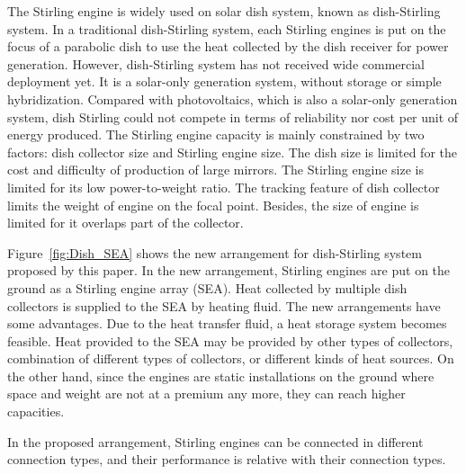 \documentclass[review,3p,10t]{elsarticle}
\begin{document}
The Stirling engine is widely used on solar dish system, known as dish-Stirling system. In a traditional dish-Stirling system, each Stirling engines is put on the focus of a parabolic dish to use the heat collected by the dish receiver for power generation. However, dish-Stirling system has not received wide commercial deployment yet. It is a solar-only generation system, without storage or simple hybridization. Compared with photovoltaics, which is also a solar-only generation system, dish Stirling could not compete in terms of reliability nor cost per unit of energy produced. The Stirling engine capacity is mainly constrained by two factors: dish collector size and Stirling engine size. The dish size is limited for the cost and difficulty of production of large mirrors. The Stirling engine size is limited for its low power-to-weight ratio. The tracking feature of dish collector limits the weight of engine on the focal point. Besides, the size of engine is limited for it overlaps part of the collector.

Figure~\ref{fig:Dish_SEA} shows the new arrangement for dish-Stirling system proposed by this paper. In the new arrangement, Stirling engines are put on the ground as a Stirling engine array (SEA). Heat collected by multiple dish collectors
 is supplied to the SEA by heating fluid. The new arrangements have some advantages. Due to the heat transfer fluid, a heat storage system becomes feasible. Heat provided to the SEA may be provided by other types of collectors, combination of different types of collectors, or different kinds of heat sources. On the other hand, since the engines are static installations on the ground where space and weight are not at a premium any more, they can reach higher capacities.


In the proposed arrangement, Stirling engines can be connected in different connection types, and their performance is relative with their connection types.

\end{document}
